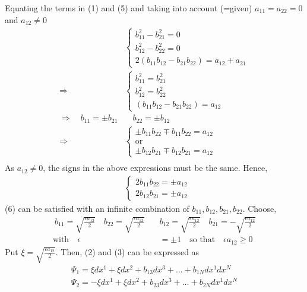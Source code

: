 Equating the terms in (1) and (5) and taking into account (=given) $a_{11}=a_{22}=0$ and $a_{12} \ne0$ 
\begin{align*}
\ &\left \{ \begin{array}{l}
 b_{11}^2 - b_{21}^2 =0\\
 b_{12}^2 - b_{22}^2 =0\\
 2\left(b_{11}b_{12} - b_{21}b_{22} \right) = a_{12}+a_{21}
\end{array}\right.\\
\Rightarrow \quad \ &\left \{ \begin{array}{l}
 b_{11}^2 = b_{21}^2 \\
 b_{12}^2 = b_{22}^2 \\
 \left(b_{11}b_{12} - b_{21}b_{22} \right) =a_{12}
\end{array}\right.\\
\Rightarrow\quad b_{11} = \pm b_{21}  &\quad b_{22} =\pm b_{12}\\ 
\Rightarrow\quad  &\left \{ \begin{array}{l} 
 \pm b_{11}b_{22} \mp b_{11}b_{22}  =a_{12}\\ 
\text{or}\\
\pm b_{12}b_{21} \mp b_{12}b_{21}  =a_{12}
\end{array}\right.\\
\end{align*}
As $a_{12} \ne0$, the signs in the above expressions must be the same. Hence,
\begin{align*}
&\left \{ \begin{array}{c} 
 2b_{11}b_{22} =\pm a_{12}\\ 
2 b_{12}b_{21} =\pm a_{12} 
\end{array}\right.
\end{align*}
(6) can be satisfied with an infinite combination of $b_{11},b_{12},b_{21}, b_{22}$. Choose,
\begin{align*} 
\ b_{11} = \sqrt{\frac{\epsilon a_{12}}{2 }}\quad b_{22} = \sqrt{\frac{\epsilon a_{12}}{2 }}\quad & b_{12} = \sqrt{\frac{\epsilon a_{12}}{2 }}\quad b_{21} = - \sqrt{\frac{\epsilon a_{12}}{2 }}\\
\text{with} \quad  \epsilon &= \pm 1\quad\text{so that}\quad \epsilon a_{12} \geq 0
\end{align*}
Put $\xi = \sqrt{\frac{\epsilon a_{12}}{2 }}$. Then, (2) and (3) can be expressed as 
\begin{align*}
\Psi_1 =  \xi dx^1+\xi dx^2 + b_{13}dx^3+ \dots +b_{1N}dx^1dx^N \\
\Psi_2 =  -\xi dx^1+\xi dx^2 + b_{23}dx^3+ \dots +b_{2N}dx^1dx^N 
\end{align*}
